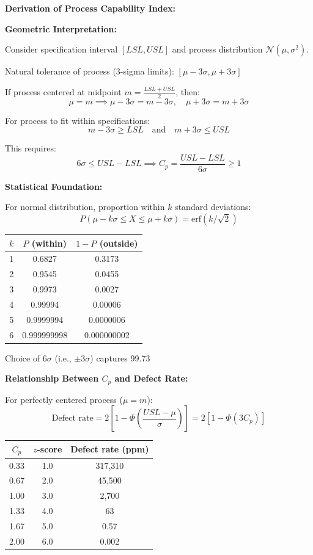 \documentclass[12pt]{article}
\begin{document}
\begin{explanation}

\textbf{Derivation of Process Capability Index:}

\textbf{Geometric Interpretation:}

Consider specification interval $[LSL, USL]$ and process distribution $\mathcal{N}(\mu, \sigma^2)$.

Natural tolerance of process (3-sigma limits): $[\mu - 3\sigma, \mu + 3\sigma]$

If process centered at midpoint $m = \frac{LSL + USL}{2}$, then:
\[
\mu = m \implies \mu - 3\sigma = m - 3\sigma, \quad \mu + 3\sigma = m + 3\sigma
\]

For process to fit within specifications:
\[
m - 3\sigma \geq LSL \quad \text{and} \quad m + 3\sigma \leq USL
\]

This requires:
\[
6\sigma \leq USL - LSL \implies C_p = \frac{USL - LSL}{6\sigma} \geq 1
\]

\textbf{Statistical Foundation:}

For normal distribution, proportion within $k$ standard deviations:
\[
P(\mu - k\sigma \leq X \leq \mu + k\sigma) = \text{erf}(k/\sqrt{2})
\]

\begin{center}
\begin{tabular}{c|c|c}
$k$ & $P$ (within) & $1-P$ (outside) \\
\hline
1 & 0.6827 & 0.3173 \\
2 & 0.9545 & 0.0455 \\
3 & 0.9973 & 0.0027 \\
4 & 0.99994 & 0.00006 \\
5 & 0.9999994 & 0.0000006 \\
6 & 0.999999998 & 0.000000002
\end{tabular}
\end{center}

Choice of $6\sigma$ (i.e., $\pm 3\sigma$) captures 99.73%

\textbf{Relationship Between $C_p$ and Defect Rate:}

For perfectly centered process ($\mu = m$):
\[
\text{Defect rate} = 2\left[1 - \Phi\left(\frac{USL - \mu}{\sigma}\right)\right] = 2\left[1 - \Phi(3C_p)\right]
\]

\begin{center}
\begin{tabular}{c|c|c}
$C_p$ & $z$-score & Defect rate (ppm) \\
\hline
0.33 & 1.0 & 317,310 \\
0.67 & 2.0 & 45,500 \\
1.00 & 3.0 & 2,700 \\
1.33 & 4.0 & 63 \\
1.67 & 5.0 & 0.57 \\
2.00 & 6.0 & 0.002
\end{tabular}
\end{center}


\end{explanation}
\end{document}
